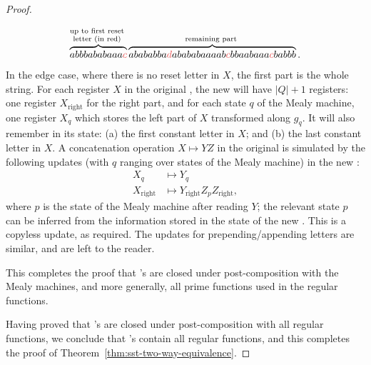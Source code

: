 \begin{proof}
\begin{itemize}
\begin{itemize}
\begin{align*}
\myoverbrace{abbbababaaa\red c}{up to first reset \\ letter (in red)}
\myoverbrace{abababba\red d abababaaaab \red c bbaabaaa \red c babbb}{remaining part}.
\end{align*}
In the edge case, where there is no reset letter in $X$, the first part is the whole string. For each register $X$ in the original \sst, the  new \sst will   have $|Q|+1$ registers: one register $X_{\text{right}}$ for the right part, and for each state $q$ of the Mealy machine, one register $X_q$  which stores the left part of $X$ transformed along $g_q$. It will also remember in its state: (a) the first constant letter in $X$; and (b) the last constant letter in $X$. A concatenation operation $X\mapsto  YZ$ in the original \sst is simulated by the following updates (with $q$ ranging over states of the Mealy machine) in the new \sst:
\begin{align*}
X_q & \mapsto  Y_q  \\
X_{\text{right}} & \mapsto  Y_{\text{right}} Z_p Z_{\text{right}},
\end{align*}
where $p$ is the state of the Mealy machine after reading $Y$; the relevant state $p$ can be inferred from the information stored in the state of the new \sst. This is a copyless update, as required. The updates for prepending/appending letters are similar, and are left to the reader.
\end{itemize}
This completes the proof that \sst's are closed under post-composition with the Mealy machines, and more generally, all prime functions used in the regular functions. 
\end{itemize}
Having proved that \sst's are closed under post-composition with all regular functions, we conclude that \sst's contain all regular functions, and this completes the proof of Theorem~\ref{thm:sst-two-way-equivalence}.
\end{proof}



\exerciseheader

